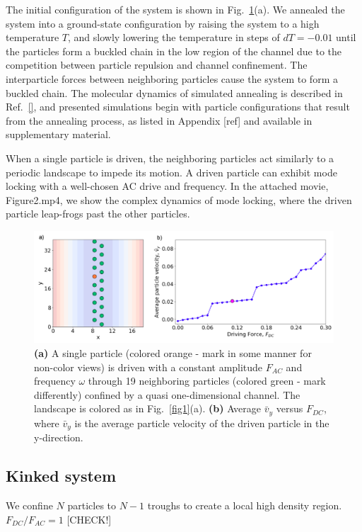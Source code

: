\documentclass[twocolumn,preprintnumbers,amsmath,amssymb,aps,prx]{revtex4}
\begin{document}
The initial configuration of the system is shown in 
Fig.~\ref{fig:2}(a).  
We annealed the system into a ground-state configuration
by raising the system to a high temperature $T$,
and slowly lowering the temperature in steps of $dT=-0.01$
until the particles form a buckled chain in the low region of the channel
due to the
competition between particle repulsion and channel confinement.
The interparticle forces between neighboring particles
cause the system to form a buckled chain. %
The molecular dynamics of simulated annealing
is described in Ref.~\ref{},
and presented simulations begin with particle configurations
that result from the annealing process,
as listed in Appendix [ref] and available in supplementary material.

When a single particle is driven, the neighboring particles act similarly to a periodic landscape to impede its motion. A driven particle can exhibit mode locking with a well-chosen AC drive and frequency. In the attached movie, Figure2.mp4, we show the complex dynamics of mode locking, where the driven particle leap-frogs past the other particles. 

\begin{center}
\begin{figure}[h!]
\centering
\includegraphics[scale=.40]{twenty}
\caption{\textbf{(a)} A single particle (colored orange - mark in some manner for non-color views) is driven with a constant amplitude $F_{AC}$ and frequency $\omega$ through 19 neighboring particles (colored green - mark differently) confined by a quasi one-dimensional channel. The landscape is colored as in Fig.~\ref{fig1}(a). \textbf{(b)} Average $\bar{v}_{y}$ versus $F_{DC}$, where $\bar{v}_{y}$ is the average particle velocity of the driven particle in the y-direction.}
\label{fig:2}
\end{figure}
\end{center}

\subsection{Kinked system}
\label{sec:kink}	%
We confine $N$ particles to $N-1$ troughs to create a
local high density region.
$F_{DC}/F_{AC} = 1$ [CHECK!]
\end{document}
